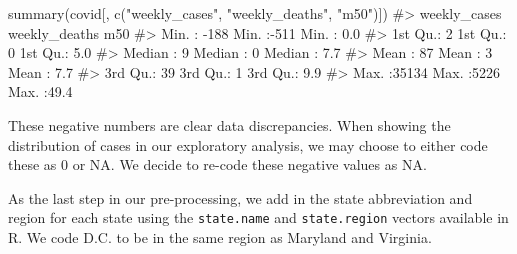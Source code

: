 \documentclass[
  letterpaper,
]{latex/krantz}
\makeatletter
\newenvironment{Shaded}{\begin{snugshade}}{\end{snugshade}}
\newcommand{\CommentTok}[1]{\textcolor[rgb]{0.37,0.37,0.37}{#1}}
\newcommand{\ConstantTok}[1]{\textcolor[rgb]{0.56,0.35,0.01}{#1}}
\newcommand{\DecValTok}[1]{\textcolor[rgb]{0.68,0.00,0.00}{#1}}
\newcommand{\FunctionTok}[1]{\textcolor[rgb]{0.28,0.35,0.67}{#1}}
\newcommand{\NormalTok}[1]{\textcolor[rgb]{0.00,0.23,0.31}{#1}}
\newcommand{\OtherTok}[1]{\textcolor[rgb]{0.00,0.23,0.31}{#1}}
\newcommand{\SpecialCharTok}[1]{\textcolor[rgb]{0.37,0.37,0.37}{#1}}
\newcommand{\StringTok}[1]{\textcolor[rgb]{0.13,0.47,0.30}{#1}}
\newenvironment{kframe}{%
\medskip{}
\setlength{\fboxsep}{.8em}
 \def\at@end@of@kframe{}%
 \ifinner\ifhmode%
  \def\at@end@of@kframe{\end{minipage}}%
  \begin{minipage}{\columnwidth}%
 \fi\fi%
 \def\FrameCommand##1{\hskip\@totalleftmargin \hskip-\fboxsep
 \colorbox{shadecolor}{##1}\hskip-\fboxsep
     \hskip-\linewidth \hskip-\@totalleftmargin \hskip\columnwidth}%
 \MakeFramed {\advance\hsize-\width
   \@totalleftmargin\z@ \linewidth\hsize
   \@setminipage}}%
 {\par\unskip\endMakeFramed%
 \at@end@of@kframe}
\renewenvironment{Shaded}{\begin{kframe}}{\end{kframe}}
\makeatother
\begin{document}
\begin{Shaded}
\begin{Highlighting}[]
\FunctionTok{summary}\NormalTok{(covid[, }\FunctionTok{c}\NormalTok{(}\StringTok{"weekly\_cases"}\NormalTok{, }\StringTok{"weekly\_deaths"}\NormalTok{, }\StringTok{"m50"}\NormalTok{)])}
\CommentTok{\#\textgreater{}   weekly\_cases   weekly\_deaths       m50      }
\CommentTok{\#\textgreater{}  Min.   : {-}188   Min.   :{-}511   Min.   : 0.0  }
\CommentTok{\#\textgreater{}  1st Qu.:    2   1st Qu.:   0   1st Qu.: 5.0  }
\CommentTok{\#\textgreater{}  Median :    9   Median :   0   Median : 7.7  }
\CommentTok{\#\textgreater{}  Mean   :   87   Mean   :   3   Mean   : 7.7  }
\CommentTok{\#\textgreater{}  3rd Qu.:   39   3rd Qu.:   1   3rd Qu.: 9.9  }
\CommentTok{\#\textgreater{}  Max.   :35134   Max.   :5226   Max.   :49.4}
\end{Highlighting}
\end{Shaded}

These negative numbers are clear data discrepancies. When showing the
distribution of cases in our exploratory analysis, we may choose to
either code these as 0 or NA. We decide to re-code these negative values
as NA.

\begin{Shaded}
\end{Shaded}

As the last step in our pre-processing, we add in the state abbreviation
and region for each state using the \texttt{state.name} and
\texttt{state.region} vectors available in R. We code D.C. to be in the
same region as Maryland and Virginia.
\end{document}
